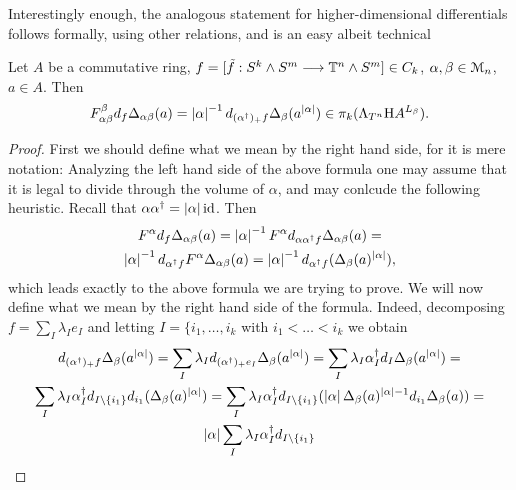   Interestingly enough, the analogous statement for higher-dimensional differentials follows formally, using other relations, and is an easy albeit technical
  \begin{cor}\label{cor_fdw_relation_arbitrary_dimensions}
  Let $A$ be a commutative ring, $f = [\tilde{f}: S^k \wedge S^m \longrightarrow \mathbb{T}^n \wedge S^m] \in C_k$, $\alpha,\beta \in \mathcal{M}_n$, $a \in A$. Then
  \begin{equation*}
    F_{\alpha\beta}^\beta d_f \Delta_{\alpha\beta} (a) =%
    \abs{\alpha}^{-1}d_{(\alpha^\dagger)_+ f} \Delta_{\beta}(a^{\abs{\alpha}})%
    \in \pi_k (\Lambda_{T^n} \H A ^{L_\beta}).%
  \end{equation*}
  \begin{proof}
   First we should define what we mean by the right hand side, for it is mere notation: Analyzing the left hand side of the above formula one may assume that it is legal to divide through the volume of $\alpha$, and may conlcude the following heuristic. Recall that $\alpha \alpha^\dagger = \left\vert\alpha\right\vert \operatorname{id}$. Then
  \begin{gather*}
      F^\alpha d_f \Delta_{\alpha\beta} (a) = %
        \abs{\alpha}^{-1} F^\alpha d_{\alpha \alpha^\dagger f}%
          \Delta_{\alpha\beta} (a) = \\ %
        \abs{\alpha}^{-1} d_{\alpha^\dagger f} F^\alpha
          \Delta_{\alpha\beta} (a) = %
        \abs{\alpha}^{-1} d_{\alpha^\dagger f}
          ( \Delta_{\beta} (a)^{\abs{\alpha}} ),%
  \end{gather*}
  which leads exactly to the above formula we are trying to prove. We will now define what we mean by the right hand side of the formula. Indeed, decomposing $f = \sum_I \lambda_I e_I$ and letting $I = \{i_1, \ldots , i_k$ with $i_1 < \ldots < i_k$ we obtain
  \begin{gather*}
    d_{(\alpha^\dagger)_+ f} \Delta_{\beta}(a^{\abs{\alpha}}) = %
    \sum_I \lambda_I d_{(\alpha^\dagger)_+ e_I} \Delta_{\beta}
      (a^{\abs{\alpha}}) = %
    \sum_I \lambda_I \alpha^\dagger_I d_I \Delta_{\beta}(a^{\abs{\alpha}}) = \\%
    \sum_I \lambda_I \alpha^\dagger_I d_{I \setminus \{i_1\}} d_{i_1}
      (\Delta_{\beta}(a)^{\abs{\alpha}}) = %
    \sum_I \lambda_I \alpha^\dagger_I d_{I \setminus \{i_1\}} (
      \abs{\alpha} \Delta_{\beta}(a)^{\abs{\alpha}-1} d_{i_1} \Delta_{\beta}(a) ) = \\%
    \abs{\alpha} \sum_I \lambda_I \alpha^\dagger_I d_{I \setminus \{i_1\}}

\end{gather*}
\end{proof}
\end{cor}
